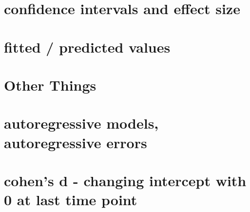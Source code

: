 \documentclass[ignorenonframetext,]{beamer}
\begin{document}
\section{confidence intervals and effect
size}\label{confidence-intervals-and-effect-size}

\section{fitted / predicted values}\label{fitted-predicted-values}

\section{Other Things}\label{other-things}

\section{autoregressive models, autoregressive
errors}\label{autoregressive-models-autoregressive-errors}

\section{cohen's d - changing intercept with 0 at last time
point}\label{cohens-d---changing-intercept-with-0-at-last-time-point}
\end{document}
